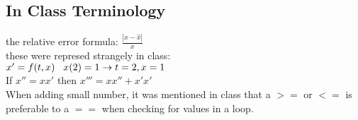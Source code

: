 \subsection*{In Class Terminology}
the relative error formula:
$ \frac{|x - \hat{x}|}{x} $\\
these were represed strangely in class:\\
$ x' = f(t,x)  \hspace{3mm} x(2) = 1 \rightarrow t = 2, x=1 $\\
If $x'' =  xx'$ then $x''' = xx'' + x'x'$\\
When adding small number, it was mentioned in class that a $>=$ or $<=$ is
preferable to a $==$ when checking for values in a loop.
